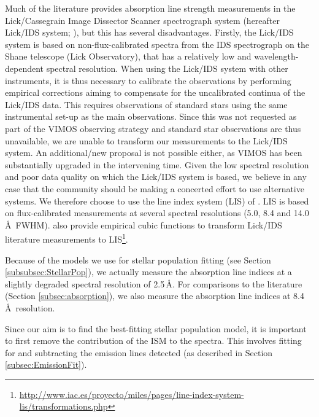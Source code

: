 			Much of the literature provides absorption line strength measurements in the Lick/Cassegrain Image Dissector Scanner spectrograph system (hereafter Lick/IDS system; \citealt{Faber1985, Worthey1994}), but this has several disadvantages. Firstly, the Lick/IDS system is based on non-flux-calibrated spectra from the IDS spectrograph on the Shane telescope (Lick Observatory), that has a relatively low and wavelength-dependent spectral resolution. When using the Lick/IDS system with other instruments, it is thus necessary to calibrate the observations by performing empirical corrections aiming to compensate for the uncalibrated continua of the Lick/IDS data. This requires observations of standard stars using the same instrumental set-up as the main observations. Since this was not requested as part of the VIMOS observing strategy and standard star observations are thus unavailable, we are unable to transform our measurements to the Lick/IDS system. An additional/new proposal is not possible either, as VIMOS has been substantially upgraded in the intervening time. Given the low spectral resolution and poor data quality on which the Lick/IDS system is based, we believe in any case that the community should be making a concerted effort to use alternative systems. We therefore choose to use the line index system (LIS) of \citet{Vazdekis2010}. LIS is based on flux-calibrated measurements at several spectral resolutions (5.0, 8.4 and 14.0\,\AA\ FWHM). \citet{Vazdekis2010} also provide empirical cubic functions to transform Lick/IDS literature measurements to LIS\footnote{\url{http://www.iac.es/proyecto/miles/pages/line-index-system-lis/transformations.php}}.

			Because of the models we use for stellar population fitting (see Section \ref{subsubsec:StellarPop}), we actually measure the absorption line indices at a slightly degraded spectral resolution of 2.5\,\AA. For comparisons to the literature (Section \ref{subsec:absorption}), we also measure the absorption line indices at 8.4\,\AA\ resolution. 

			Since our aim is to find the best-fitting stellar population model, it is important to first remove the contribution of the ISM to the spectra. This involves fitting for and subtracting the emission lines detected (as described in Section \ref{subsec:EmissionFit}). 

